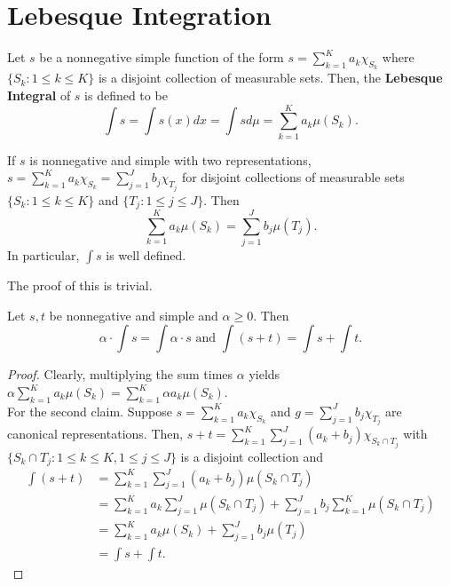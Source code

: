 \section{Lebesque Integration}
\begin{definition}
Let \(s\) be a	nonnegative simple function of the form \(s = \sum_{k= 1}^{K} a_{k}\chi_{S_{k}}\) where \(\{S_{k} : 1\le k \le K\} \) is a disjoint collection of measurable sets. Then, the \textbf{Lebesque Integral} of \(s\) is defined to be \[
	\int s = \int s\left( x \right) dx = \int s d\mu = \sum_{k=1}^{K} a_{k} \mu\left( S_{k} \right)
.\]
\end{definition}
\begin{proposition}
	If \(s\) is nonnegative and simple with two representations, \(s = \sum_{k=1}^{K} a_{k} \chi _{S_{k}} = \sum_{j=1}^{J} b_{j} \chi _{T_{j}}\) for disjoint collections of measurable sets \(\{S_{k} : 1 \le k \le K\} \) and \(\{T_{j} : 1\le j \le J\} \). Then \[
		\sum_{k=1}^{K} a_{k} \mu\left( S_{k} \right)  = \sum_{j=1}^{J} b_{j} \mu\left( T_{j} \right)
	.\]
	In particular, \(\int s\) is well defined.
\end{proposition}
The proof of this is trivial.
\begin{lemma}
Let \(s, t\) be nonnegative and simple and \(\alpha \ge 0\). Then \[
	\alpha \cdot \int s  = \int \alpha \cdot s \text{ and } \int (s+t) = \int s + \int t

.\]
\end{lemma}
\begin{proof}
	Clearly, multiplying the sum times \(\alpha\) yields \(\alpha \sum_{k=1}^{K} a_{k} \mu\left( S_{k} \right)  = \sum_{k=1}^{K} \alpha a_{k} \mu\left( S_{k} \right) \).\\
	For the second claim. Suppose \(s = \sum_{k=1}^{K} a_{k} \chi_{S_{k}}\) and \(g = \sum_{j=1}^{J} b_{j} \chi_{T_{j}}\) are canonical representations. Then, \(s + t = \sum_{k=1}^{K} \sum_{j=1}^{J} \left( a_{k} + b_{j} \right) \chi_{S_{k} \cap T_{j}}\) with \(\{S_{k} \cap T_{j} : 1 \le k \le K, 1\le j \le J\} \) is a disjoint collection and
	\begin{align*}
		\int\left( s+t \right) &= \sum_{k=1}^{K} \sum_{j=1}^{J} \left( a_{k} + b_{j} \right) \mu\left( S_{k} \cap T_{j} \right)  \\
				       &= \sum_{k=1}^{K} a_{k} \sum_{j=1}^{J} \mu\left( S_{k} \cap T_{j} \right) + \sum_{j=1}^{J} b_{j} \sum_{k=1}^{K} \mu\left( S_{k} \cap T_{j} \right)  \\
				       &= \sum_{k=1}^{K} a_{k} \mu\left( S_{k} \right) + \sum_{j=1}^{J} b_{j} \mu\left( T_{j} \right)   \\
				       &= \int s + \int t.
	\end{align*}
\end{proof}
